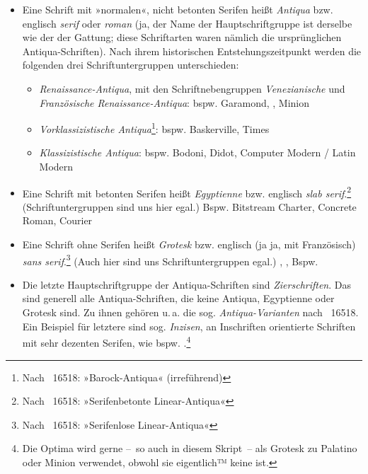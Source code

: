 \begin{itemize}
\item Eine Schrift mit »normalen«, nicht betonten Serifen heißt
  \emph{Antiqua} bzw. englisch \emph{\foreignlanguage{british}{serif}}
  oder \emph{\foreignlanguage{british}{roman}} (ja, der Name der
  Hauptschriftgruppe ist derselbe wie der der Gattung; diese
  Schriftarten waren nämlich die ursprünglichen Antiqua-Schriften).
  Nach ihrem historischen Entstehungszeitpunkt werden die folgenden
  drei Schriftuntergruppen unterschieden:
  \begin{itemize}
  \item \emph{Renaissance-Antiqua}, mit den Schriftnebengruppen
    \emph{Venezianische} und \emph{Französische Renaissance-Antiqua}:
    bspw. {\selectfont Garamond},
    {\selectfont {}}, %
    Minion
  \item \emph{Vorklassizistische Antiqua}\footnote{Nach
      ~16518: »Barock-Antiqua« (irreführend)}:
    bspw. {\selectfont Baskerville},
    {\selectfont Times} %
  \item \emph{Klassizistische Antiqua}:
    bspw. {\selectfont Bodoni},
    {\selectfont Didot},
    {\selectfont Computer Modern / Latin Modern}
  \end{itemize}
\item Eine Schrift mit betonten Serifen heißt \emph{Egyptienne} bzw.
  englisch \emph{\foreignlanguage{british}{slab serif}}.\footnote{Nach
    ~16518: »Serifenbetonte Linear-Antiqua«}
  (Schriftuntergruppen sind uns hier egal.)  Bspw.
  {\selectfont Bitstream Charter},
  {\selectfont Concrete Roman},
  {\selectfont Courier} %
\item Eine Schrift ohne Serifen heißt \emph{Grotesk} bzw. englisch (ja
  ja, mit Französisch) \emph{\foreignlanguage{british}{sans
      serif}}.\footnote{Nach ~16518: »Serifenlose
    Linear-Antiqua«} (Auch hier sind uns Schriftuntergruppen egal.)
  {\selectfont {}}, %
  {\selectfont {}}, %
  Bspw.  {\selectfont {}} %
\item Die letzte Hauptschriftgruppe der Antiqua-Schriften sind
  \emph{Zierschriften}.  Das sind generell alle Antiqua-Schriften, die
  keine Antiqua, Egyptienne oder Grotesk sind. Zu ihnen gehören
  u.\,a. die sog. \emph{Antiqua-Varianten} nach ~16518.  Ein
  Beispiel für letztere sind sog. \emph{Inzisen}, an Inschriften
  orientierte Schriften mit sehr dezenten Serifen, wie bspw.
  \textsf{}.\footnote{Die Optima
    wird gerne --~so auch in diesem Skript~-- als Grotesk zu Palatino
    oder Minion verwendet, obwohl sie eigentlich™ keine ist.}
\end{itemize}
